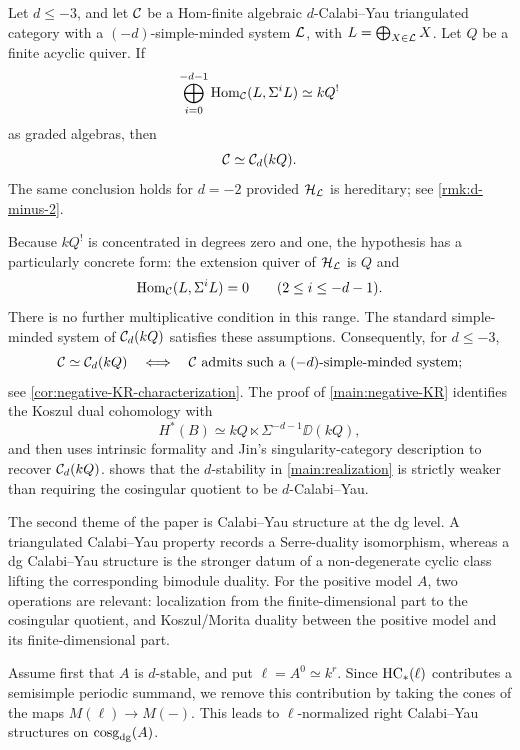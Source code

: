 \documentclass[11pt,a4paper,dvipsnames,x11names]{amsart}
\begin{document}
\begin{mainthm}\label{main:negative-KR}
Let $d\leq-3$, and let $\mathcal C$ be a Hom-finite algebraic $d$-Calabi--Yau triangulated category with a $(-d)$-simple-minded system $\mathcal L$, with $L=\bigoplus_{X\in\mathcal L}X$. Let $Q$ be a finite acyclic quiver. If
\[
\bigoplus_{i=0}^{-d-1}\operatorname{Hom}_\mathcal C(L,\Sigma^iL)\simeq kQ^!
\]
as graded algebras, then
\[
\mathcal C\simeq\mathcal C_d(kQ).
\]
The same conclusion holds for $d=-2$ provided $\mathcal H_\mathcal L$ is hereditary; see \cref{rmk:d-minus-2}.
\end{mainthm}

Because $kQ^!$ is concentrated in degrees zero and one, the hypothesis has a particularly concrete form: the extension quiver of $\mathcal H_{\mathcal L}$ is $Q$ and
\[
\operatorname{Hom}_\mathcal C(L,\Sigma^iL)=0\qquad(2\leq i\leq-d-1).
\]
There is no further multiplicative condition in this range. The standard simple-minded system of $\mathcal C_d(kQ)$ satisfies these assumptions. Consequently, for $d\leq-3$,
\[
\mathcal C\simeq\mathcal C_d(kQ)
\quad\Longleftrightarrow\quad
\mathcal C\text{ admits such a $(-d)$-simple-minded system};
\]
see \cref{cor:negative-KR-characterization}. The proof of \cref{main:negative-KR} identifies the Koszul dual cohomology with
\[
H^*(B)\simeq kQ\ltimes\Sigma^{-d-1}\DD(kQ),
\]
and then uses intrinsic formality and Jin's singularity-category description to recover $\mathcal C_d(kQ)$.  shows that the $d$-stability in \cref{main:realization} is strictly weaker than requiring the cosingular quotient to be $d$-Calabi--Yau.

The second theme of the paper is Calabi--Yau structure at the dg level. A triangulated Calabi--Yau property records a Serre-duality isomorphism, whereas a dg Calabi--Yau structure is the stronger datum of a non-degenerate cyclic class lifting the corresponding bimodule duality. For the positive model $A$, two operations are relevant: localization from the finite-dimensional part to the cosingular quotient, and Koszul/Morita duality between the positive model and its finite-dimensional part.

Assume first that $A$ is $d$-stable, and put $\ell=A^0\simeq k^r$. Since $\operatorname{HC}_*(\ell)$ contributes a semisimple periodic summand, we remove this contribution by taking the cones of the maps $M(\ell)\to M(-)$. This leads to $\ell$-normalized right Calabi--Yau structures on $\operatorname{cosg}_{\mathrm{dg}}(A)$.
\end{document}
